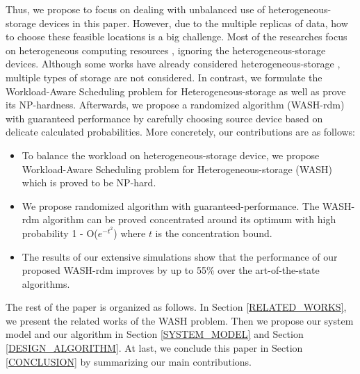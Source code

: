 \documentclass[conference]{IEEEtran}
\begin{document}
Thus, we propose to focus on dealing with unbalanced use of heterogeneous-storage devices in this paper. However, due to the multiple replicas of data, how to choose these feasible locations is a big challenge.
 Most of the researches focus on heterogeneous computing resources \cite{b25}\cite{b26}\cite{b35}\cite{b36}, ignoring the heterogeneous-storage devices. Although some works have already considered heterogeneous-storage \cite{b6}\cite{b7}, multiple types of storage are not considered. In contrast, we formulate the Workload-Aware Scheduling problem for Heterogeneous-storage as well as prove its NP-hardness. Afterwards, we propose a randomized algorithm (WASH-rdm) with guaranteed performance by carefully choosing source device based on delicate calculated probabilities.
More concretely, our contributions are as follows: 

\begin{itemize}
\item To balance the workload on heterogeneous-storage device, we propose Workload-Aware Scheduling problem for Heterogeneous-storage (WASH) which is proved to be NP-hard. 
\item We propose randomized algorithm with guaranteed-performance. The WASH-rdm algorithm can be proved concentrated around its optimum with high probability 1 - O($e^{-t^2}$) where $t$ is the concentration bound.
\item The results of our extensive simulations show that the performance of our proposed WASH-rdm improves by up to 55\% over the art-of-the-state algorithms.
\end{itemize}

The rest of the paper is organized as follows. In Section \ref{RELATED_WORKS}, we present the related works of the WASH problem. Then we propose our system model and our algorithm in Section  \ref{SYSTEM_MODEL} and Section  \ref{DESIGN_ALGORITHM}. At last, we conclude this paper in Section \ref{CONCLUSION} by summarizing our main contributions.
\end{document}
